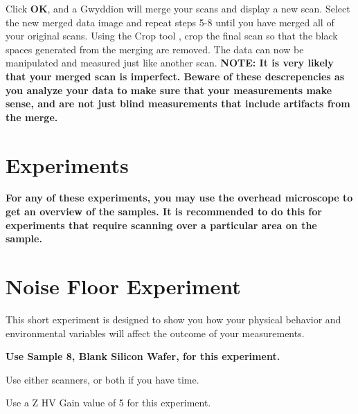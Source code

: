 \documentclass{../lab}
\begin{document}
\textbf{​}Click \textbf{OK}, and a Gwyddion will merge your scans and display a new scan.
\textbf{​}Select the new merged data image and repeat steps 5-8 until you have merged all of your original scans.
Using the Crop tool , crop the final scan so that the black spaces generated from the merging are removed.
The data can now be manipulated and measured just like another scan.
\textbf{NOTE: It is very likely that your merged scan is imperfect.  Beware of these descrepencies as you analyze your data to make sure that your measurements make sense, and are not just blind measurements that include artifacts from the merge.}\section{Experiments}

\textbf{For any of these experiments, you may use the overhead microscope to get an overview of the samples.  It is recommended to do this for experiments that require scanning over a particular area on the sample.}\section{Noise Floor Experiment}

This short experiment is designed to show you how your physical behavior and environmental variables will affect the outcome of your measurements.

\textbf{Use Sample 8, Blank Silicon Wafer, for this experiment.}

Use either scanners, or both if you have time. \textbf{}

Use a Z HV Gain value of 5 for this experiment.
\end{document}
